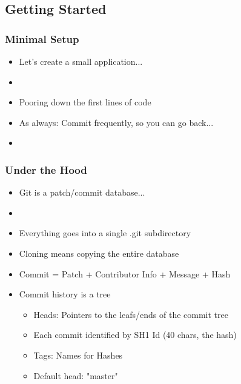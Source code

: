 \subsection{Getting Started}

\begin{slide}[fragile]
  \frametitle{Minimal Setup}
  \begin{itemize}
    \item Let's create a small application...
    \item[]
    \item Pooring down the first lines of code
    \item As always: Commit frequently, so you can go back...
    \item[]
  \end{itemize}
\end{slide}

\begin{slide}[fragile]
  \frametitle{Under the Hood}
  \begin{itemize}
    \item Git is a patch/commit database...
    \item[]
    \item Everything goes into a single .git subdirectory
    \item Cloning means copying the entire database
    \item Commit = Patch + Contributor Info + Message + Hash
    \item Commit history is a tree
    \begin{itemize}
      \item Heads: Pointers to the leafs/ends of the commit tree
      \item Each commit identified by SH1 Id (40 chars, the hash)
      \item Tags: Names for Hashes
      \item Default head: "master"
    \end{itemize}
  \end{itemize}
\end{slide}

